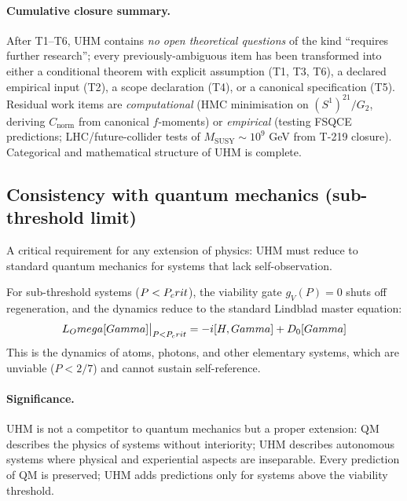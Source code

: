 \paragraph{Cumulative closure summary.}
After T1--T6, UHM contains \emph{no open theoretical questions} of the
kind ``requires further research''; every previously-ambiguous item has been
transformed into either a conditional theorem with explicit assumption ({T1, T3,
T6}), a declared empirical input ({T2}), a scope declaration ({T4}), or a
canonical specification ({T5}). Residual work items are \emph{computational}
(HMC minimisation on $(S^1)^{21}/G_2$, deriving $C_{\mathrm{norm}}$ from
canonical $f$-moments) or \emph{empirical} (testing FSQCE predictions;
LHC/future-collider tests of $M_{\mathrm{SUSY}} \sim 10^9$ GeV from T-219
closure). Categorical and mathematical structure of UHM is complete.

\subsection{Consistency with quantum mechanics (sub-threshold limit)}
\label{subsec:qm-limit}

A critical requirement for any extension of physics: UHM must reduce to standard quantum
mechanics for systems that lack self-observation.

\begin{theorembox}
For sub-threshold systems ($P < P_crit$), the viability gate $g_V(P) = 0$ shuts off
regeneration, and the dynamics reduce to the standard Lindblad master equation:
\begin{equation}
  L_Omega[Gamma]\big|_{P < P_crit} = -i[H, Gamma] + D_0[Gamma]
  \label{eq:qm-limit}
\end{equation}
This is the dynamics of atoms, photons, and other elementary systems, which are unviable
($P < 2/7$) and cannot sustain self-reference.
\end{theorembox}

\paragraph{Significance.}
UHM is not a competitor to quantum mechanics but a proper extension: QM describes the
physics of systems without interiority; UHM describes autonomous systems where physical
and experiential aspects are inseparable. Every prediction of QM is preserved; UHM adds
predictions only for systems above the viability threshold.

